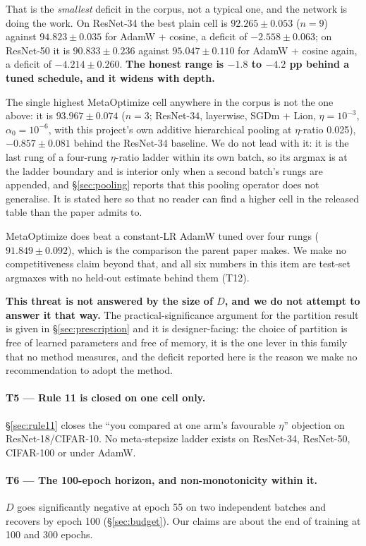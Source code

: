 \documentclass[10pt,letterpaper]{article}
\newcommand{\Dstat}{D}                         %
\begin{document}
That is the \emph{smallest} deficit in the corpus, not a typical one, and the network is doing the
work. On ResNet-34 the best plain cell is $92.265 \pm 0.053$ ($n = 9$) against $94.823 \pm 0.035$
for AdamW + cosine, a deficit of $\mathbf{-2.558 \pm 0.063}$; on ResNet-50 it is
$90.833 \pm 0.236$ against $95.047 \pm 0.110$ for AdamW + cosine again, a deficit of
$\mathbf{-4.214 \pm 0.260}$.
\textbf{The honest range is $-1.8$ to $-4.2$ pp behind a tuned schedule, and it widens with
depth.}

The single highest MetaOptimize cell anywhere in the corpus is not the one above: it is
$93.967 \pm 0.074$ ($n = 3$; ResNet-34, layerwise, SGDm + Lion, $\eta = 10^{-3}$,
$\alpha_0 = 10^{-6}$, with this project's own additive hierarchical pooling at $\eta$-ratio 0.025),
$-0.857 \pm 0.081$ behind the ResNet-34 baseline. We do not lead with it: it is the last rung of a
four-rung $\eta$-ratio ladder within its own batch, so its argmax is at the ladder boundary and is
interior only when a second batch's rungs are appended, and \S\ref{sec:pooling} reports that this
pooling operator does not generalise. It is stated here so that no reader can find a higher cell in
the released table than the paper admits to.

MetaOptimize does beat a constant-LR AdamW tuned over four rungs ($91.849 \pm 0.092$), which is the
comparison the parent paper makes. We make no competitiveness claim beyond that, and all six
numbers in this item are test-set argmaxes with no held-out estimate behind them (T12).

\textbf{This threat is not answered by the size of $\Dstat$, and we do not attempt to answer it
that way.} The practical-significance argument for the partition result is given in
\S\ref{sec:prescription} and it is designer-facing: the choice of partition is free of learned
parameters and free of memory, it is the one lever in this family that no method measures, and the
deficit reported here is the reason we make no recommendation to adopt the method.

\paragraph{T5 --- Rule 11 is closed on one cell only.}
\S\ref{sec:rule11} closes the ``you compared at one arm's favourable $\eta$'' objection on
ResNet-18/CIFAR-10. No meta-stepsize ladder exists on ResNet-34, ResNet-50, CIFAR-100 or under
AdamW.

\paragraph{T6 --- The 100-epoch horizon, and non-monotonicity within it.}
$\Dstat$ goes significantly negative at epoch 55 on two independent batches and recovers by epoch
100 (\S\ref{sec:budget}). Our claims are about the end of training at 100 and 300 epochs.
\end{document}
